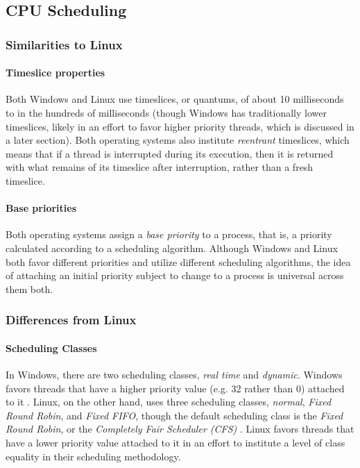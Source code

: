 \documentclass[letterpaper,10pt,titlepage]{article}
\begin{document}
\subsection{CPU Scheduling}  
\subsubsection{Similarities to Linux}
\paragraph{Timeslice properties}
Both Windows and Linux use timeslices, or quantums, of about 10 milliseconds to in the hundreds of milliseconds (though Windows has traditionally lower timeslices, likely in an effort to favor higher priority threads, which is discussed in a later section). Both operating systems also institute \emph{reentrant} timeslices, which means that if a thread is interrupted during its execution, then it is returned with what remains of its timeslice after interruption, rather than a fresh timeslice.
\paragraph{Base priorities}
Both operating systems assign a \emph{base priority} to a process, that is, a priority calculated according to a scheduling algorithm. Although Windows and Linux both favor different priorities and utilize different scheduling algorithms, the idea of attaching an initial priority subject to change to a process is universal across them both.
\subsubsection{Differences from Linux}
\paragraph{Scheduling Classes} 
In Windows, there are two scheduling classes, \emph{real time} and \emph{dynamic}. Windows favors threads that have a higher priority value (e.g. 32 rather than 0) attached to it \cite{rus122}. Linux, on the other hand, uses three scheduling classes, \emph{normal}, \emph{Fixed Round Robin}, and \emph{Fixed FIFO}, though the default scheduling class is the \emph{Fixed Round Robin}, or the \emph{Completely Fair Scheduler (CFS)} \cite{ker10}. Linux favors threads that have a lower priority value attached to it in an effort to institute a level of class equality in their scheduling methodology.
\end{document}
